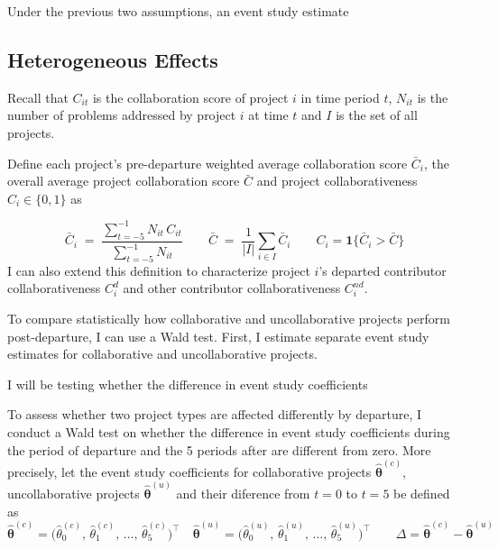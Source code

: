 \documentclass[12pt,notitlepage]{article}
\begin{document}
Under the previous two assumptions, an event study estimate 

\subsection{Heterogeneous Effects}

Recall that $C_{it}$ is the collaboration score of project $i$ in time period $t$, $N_{it}$ is the number of problems addressed by project $i$ at time $t$ and $I$ is the set of all projects.

Define each project’s pre-departure weighted average collaboration score $\bar C_i$,  the overall average project collaboration score $\bar C$ and project collaborativeness $C_i \in \{0, 1\}$ as

\[
\bar C_i \;=\;
\frac{\displaystyle\sum_{t=-5}^{-1} N_{it}\,C_{it}}
     {\displaystyle\sum_{t=-5}^{-1} N_{it}}
\qquad 
\bar C \;=\;
\frac{1}{\lvert I\rvert}\sum_{i\in I}\bar C_i
\qquad 
C_i = \mathbf{1}\{\bar C_i > \bar C\}
\]
I can also extend this definition to characterize project $i$'s departed contributor collaborativeness $C_i^d$ and other contributor collaborativeness $C_i^{nd}$.  

To compare statistically how collaborative and uncollaborative projects perform post-departure, I can use a Wald test. First, I estimate separate event study estimates for collaborative and uncollaborative projects. 

I will be testing whether the difference in event study coefficients  

To assess whether two project types are affected differently by departure, I conduct a Wald test on whether the difference in event study coefficients during the period of departure and the 5 periods after are different from zero. More precisely, let the event study coefficients for collaborative projects $\hat{\boldsymbol\theta}^{(c)}$, uncollaborative projects $\hat{\boldsymbol\theta}^{(u)}$ and their diference from $t=0$ to $t=5$ be defined as
\[
  \hat{\boldsymbol\theta}^{(c)}
    = \bigl(\hat\theta^{(c)}_{0},\,\hat\theta^{(c)}_{1},\,\dots,\,\hat\theta^{(c)}_{5}\bigr)^{\!\top}
  \quad
  \hat{\boldsymbol\theta}^{(u)}
    = \bigl(\hat\theta^{(u)}_{0},\,\hat\theta^{(u)}_{1},\,\dots,\,\hat\theta^{(u)}_{5}\bigr)^{\!\top}
    \qquad 
  \Delta = \hat{\boldsymbol\theta}^{(c)} - \hat{\boldsymbol\theta}^{(u)}
\]
\end{document}
